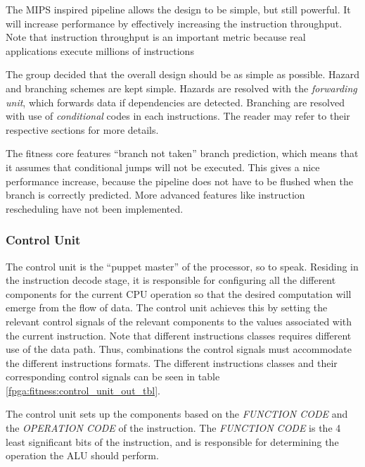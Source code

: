 The MIPS inspired pipeline allows the design to be simple, but still powerful.
It  will increase performance by effectively increasing the instruction throughput.
Note that instruction throughput is an important metric because real applications execute millions of instructions \cite[p.~335]{compOrgDes}


The group decided that the overall design should be as simple as possible.
Hazard and branching schemes are kept simple.
Hazards are resolved with the \emph{forwarding unit}, which forwards data if dependencies are detected.
Branching are resolved with use of \emph{conditional} codes in each instructions.
The reader may refer to their respective sections for more details.

The fitness core features ``branch not taken'' branch prediction, which means that it assumes that conditional jumps will not be executed.
This gives a nice performance increase, because the pipeline does not have to be flushed when the branch is correctly predicted.
More advanced features like instruction rescheduling have not been implemented.

\subsubsection{Control Unit} 

The control unit is the ``puppet master'' of the processor, so to speak.
Residing in the instruction decode stage, it is responsible for configuring all the different components for the current CPU operation so that the desired computation will emerge from the flow of data.
The control unit achieves this by setting the relevant control signals of the relevant components to the values associated with the current instruction.
Note that different instructions classes requires different use of the data path.
Thus, combinations the control signals must accommodate the different instructions formats. The different instructions classes and their corresponding control signals can be seen in table \ref{fpga:fitness:control_unit_out_tbl}. 

The control unit sets up the components based on the \emph{FUNCTION CODE} and the \emph{OPERATION CODE} of the instruction.
The \emph{FUNCTION CODE} is the 4 least significant bits of the instruction, and is responsible for determining the operation the ALU should perform. 


 



